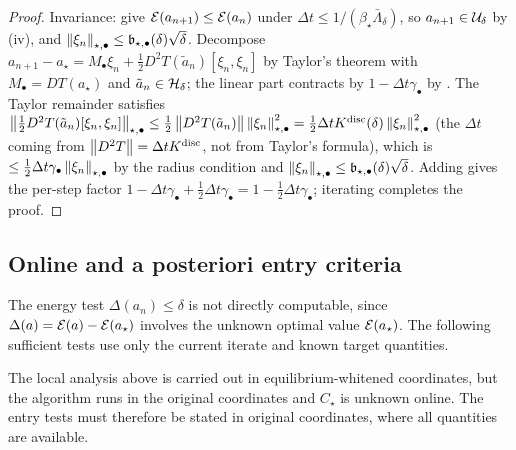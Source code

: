 \begin{proof}
Invariance:  give
$\mathcal{E}(a_{n+1})\leq\mathcal{E}(a_n)$ under
$\Delta t\leq1/(\beta_\star\bar\Lambda_\delta)$, so $a_{n+1}\in\mathcal{U}_\delta$ by
(iv), and $\left\lVert \xi_n\right\rVert_{\star,\bullet}\leq\mathfrak b_{\star,\bullet}(\delta)\sqrt\delta$.
Decompose $a_{n+1}-a_\star=M_\bullet\xi_n+\tfrac12 D^2T(\tilde a_n)[\xi_n,\xi_n]$ by
Taylor's theorem with $M_\bullet=DT(a_\star)$ and $\tilde a_n\in\mathcal{H}_\delta$; the linear part
contracts by $1-\Delta t\gamma_\bullet$ by .
The Taylor remainder satisfies
$\left\lVert \tfrac12 D^2T(\tilde a_n)[\xi_n,\xi_n]\right\rVert_{\star,\bullet}\leq\tfrac12\left\lVert D^2T(\tilde a_n)\right\rVert\left\lVert \xi_n\right\rVert_{\star,\bullet}^2
=\tfrac12\Delta tK^{\mathrm{disc}}(\delta)\left\lVert \xi_n\right\rVert_{\star,\bullet}^2$
(the $\Delta t$ coming from $\left\lVert D^2T\right\rVert=\Delta tK^{\mathrm{disc}}$, not from Taylor's formula), which is
$\leq\tfrac12\Delta t\gamma_\bullet\left\lVert \xi_n\right\rVert_{\star,\bullet}$ by the radius condition and
$\left\lVert \xi_n\right\rVert_{\star,\bullet}\leq\mathfrak b_{\star,\bullet}(\delta)\sqrt\delta$. Adding gives the
per-step factor $1-\Delta t\gamma_\bullet+\tfrac12\Delta t\gamma_\bullet=1-\tfrac12\Delta t\gamma_\bullet$;
iterating completes the proof.
\end{proof}

\subsection{Online and a posteriori entry criteria}
\label{subsec:entry}

The energy test $\Delta(a_n)\leq\delta$ is not directly computable, since
$\Delta(a)=\mathcal{E}(a)-\mathcal{E}(a_\star)$ involves the unknown optimal value $\mathcal{E}(a_\star)$. The
following sufficient tests use only the current iterate and known target quantities.

The local analysis above is carried out in equilibrium-whitened coordinates, but the
algorithm runs in the original coordinates and $C_\star$ is unknown online. The entry tests
must therefore be stated in original coordinates, where all quantities are available.

